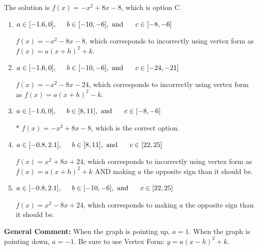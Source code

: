 \documentclass{extbook}[14pt]
\begin{document}
\begin{enumerate}
{The solution is \( f(x) = -x^{2} +8 x -8 \), which is option C.\begin{enumerate}[label=\Alph*.]
\item \( a \in [-1.6, 0], \hspace*{5mm} b \in [-10, -6], \text{ and } \hspace*{5mm} c \in [-8, -6] \)

$f(x)=-x^{2} -8 x -8$, which corresponds to incorrectly using vertex form as $f(x) = a(x+h)^2+k$.
\item \( a \in [-1.6, 0], \hspace*{5mm} b \in [-10, -6], \text{ and } \hspace*{5mm} c \in [-24, -21] \)

$f(x)=-x^{2} -8 x -24$, which corresponds to incorrectly using vertex form as $f(x) = a(x+h)^2 - k$.
\item \( a \in [-1.6, 0], \hspace*{5mm} b \in [8, 11], \text{ and } \hspace*{5mm} c \in [-8, -6] \)

* $f(x)=-x^{2} +8 x -8$, which is the correct option.
\item \( a \in [-0.8, 2.1], \hspace*{5mm} b \in [8, 11], \text{ and } \hspace*{5mm} c \in [22, 25] \)

$f(x)=x^{2} +8 x + 24$, which corresponds to incorrectly using vertex form as $f(x) = a(x+h)^2+k$ AND making $a$ the opposite sign than it should be.
\item \( a \in [-0.8, 2.1], \hspace*{5mm} b \in [-10, -6], \text{ and } \hspace*{5mm} c \in [22, 25] \)

$f(x)=x^{2} -8 x + 24$, which corresponds to making $a$ the opposite sign than it should be.
\end{enumerate}

\textbf{General Comment:} When the graph is pointing up, $a=1$. When the graph is pointing down, $a=-1$. Be sure to use Vertex Form: $y = a(x-h)^2+k$.
}
\end{enumerate}
\end{document}

